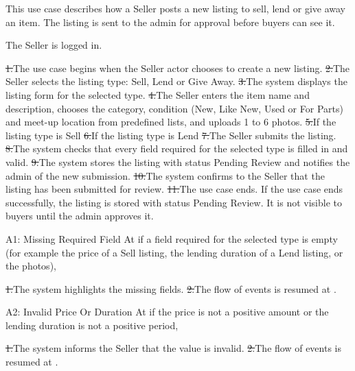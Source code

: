 This use case describes how a Seller posts a new listing to sell, lend or give away an item. The listing is sent to the admin for approval before buyers can see it.\par
{}
The Seller is logged in.\par
{}
\st{1.}{The use case begins when the Seller actor chooses to create a new listing.}
\st{2.}{The Seller selects the listing type: Sell, Lend or Give Away.}
\st{3.}{The system displays the listing form for the selected type.}
\st{4.}{The Seller enters the item name and description, chooses the category, condition (New, Like New, Used or For Parts) and meet-up location from predefined lists, and uploads 1 to 6 photos.}
\st{5.}{If the listing type is Sell}
\st{6.}{If the listing type is Lend}
\st{7.}{The Seller submits the listing.}
\st{8.}{The system checks that every field required for the selected type is filled in and valid.}
\st{9.}{The system stores the listing with status Pending Review and notifies the admin of the new submission.}
\st{10.}{The system confirms to the Seller that the listing has been submitted for review.}
\st{11.}{The use case ends.}
If the use case ends successfully, the listing is stored with status Pending Review. It is not visible to buyers until the admin approves it.\par
{}
\begin{flowblock}{A1: Missing Required Field}
At  if a field required for the selected type is empty (for example the price of a Sell listing, the lending duration of a Lend listing, or the photos),\par
\st{1.}{The system highlights the missing fields.}
\st{2.}{The flow of events is resumed at .}
\end{flowblock}
\begin{flowblock}{A2: Invalid Price Or Duration}
At  if the price is not a positive amount or the lending duration is not a positive period,\par
\st{1.}{The system informs the Seller that the value is invalid.}
\st{2.}{The flow of events is resumed at .}
\end{flowblock}
